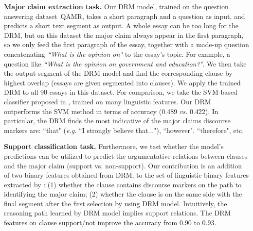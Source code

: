 

\textbf{Major claim extraction task.} Our DRM model, trained on the question answering dataset~\textsc{QAMR}, takes a short paragraph and a question as input, and predicts a short text segment as output. A whole essay can be too long for the DRM, but on this dataset the major claim always appear in the first paragraph, so we only feed the first paragraph of the essay, together with a made-up question concatenating \textit{``What is the opinion on"} to the essay's topic. For example, a question like \textit{``What is the opinion on government and education?"}. We then take the output segment of the DRM model and find the corresponding clause by highest overlap (essays are given segmented into clauses). 
We apply the trained DRM to all 90 essays in this dataset. For comparison, we take the SVM-based classifier proposed in \cite{DBLP:conf/emnlp/StabG14}, trained on many linguistic features. Our DRM outperforms the SVM method in terms of accuracy (0.489 \emph{vs.} 0.422). In particular, the DRM finds the most indicative of the major claims discourse markers are: ``that" (\emph{e.g.} ``I strongly believe that..."), ``however", ``therefore", etc.




\textbf{Support classification task.} Furthermore, we test whether the model's predictions can be utilized to predict the argumentative relations between clauses and the major claim (support vs. non-support). Our contribution is an addition of two binary features obtained from DRM, to the set of linguistic binary features extracted by \cite{DBLP:conf/emnlp/StabG14}: (1) whether the clause contains discourse markers on the path to identifying the major claim; (2) whether the clause is on the same side with the final segment after the first selection by using DRM model. Intuitively, the reasoning path learned by DRM model implies support relations. The DRM features on clause support/not improve the accuracy from 0.90 to 0.93.


